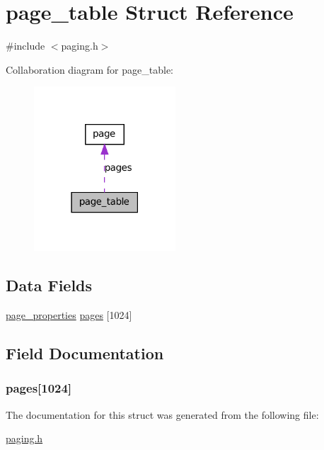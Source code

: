 \hypertarget{structpage__table}{
\section{page\_\-table Struct Reference}
\label{structpage__table}
}


{\ttfamily \#include $<$paging.h$>$}



Collaboration diagram for page\_\-table:\nopagebreak
\begin{figure}[H]
\begin{center}
\leavevmode
\includegraphics[width=150pt]{structpage__table__coll__graph}
\end{center}
\end{figure}
\subsection*{Data Fields}
\begin{DoxyCompactItemize}
\item 
\hyperlink{structpage}{page\_\-properties} \hyperlink{structpage__table_aaa911a7bd72c51b64df7bce29575eebe}{pages} \mbox{[}1024\mbox{]}
\end{DoxyCompactItemize}


\subsection{Field Documentation}
\hypertarget{structpage__table_aaa911a7bd72c51b64df7bce29575eebe}{
\subsubsection[{pages}]{ {\bf pages}\mbox{[}1024\mbox{]}}}
\label{structpage__table_aaa911a7bd72c51b64df7bce29575eebe}


The documentation for this struct was generated from the following file:\begin{DoxyCompactItemize}
\item 
\hyperlink{paging_8h}{paging.h}\end{DoxyCompactItemize}
